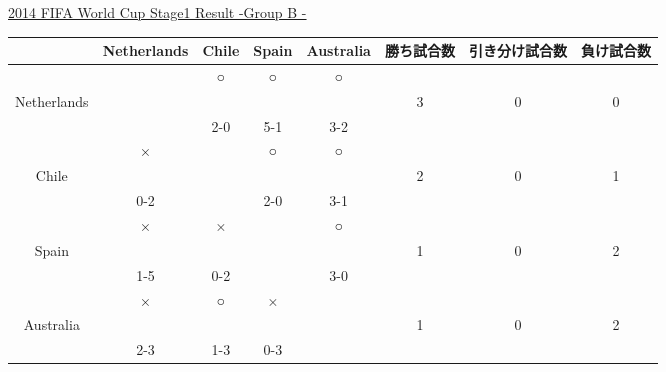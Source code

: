 \documentclass[a4j] {jarticle}
\begin{document}
		\begin{table}[htb]
		\begin{center}
		\underline{2014 FIFA World Cup Stage1 Result
-Group B
-}
		\begin{tabular}{|c|c|c|c|c|c|c|c|}
		\hline
		\multicolumn{1}{|c|}{} &
		\multicolumn{1}{c|}{Netherlands} &
		\multicolumn{1}{c|}{Chile} &
		\multicolumn{1}{c|}{Spain} &
		\multicolumn{1}{c|}{Australia} &
		\multicolumn{1}{c|}{勝ち試合数} &
		\multicolumn{1}{c|}{引き分け試合数} &
		\multicolumn{1}{c|}{負け試合数} \\
		\hline
 &  & ○ & ○ & ○ & & & \\ 
Netherlands & & & & & 3 & 0 & 0 \\ 
 & & 2-0 & 5-1 & 3-2 &  & & \\ 
 \hline
 & × &  & ○ & ○ & & & \\ 
Chile & & & & & 2 & 0 & 1 \\ 
 &0-2 &  & 2-0 & 3-1 &  & & \\ 
 \hline
 & × & × &  & ○ & & & \\ 
Spain & & & & & 1 & 0 & 2 \\ 
 &1-5 & 0-2 &  & 3-0 &  & & \\ 
 \hline
 & × & ○ & × &  & & & \\ 
Australia & & & & & 1 & 0 & 2 \\ 
 &2-3 & 1-3 & 0-3 &  &  & & \\ 
 \hline
		\end{tabular}
		\end{center}
		\end{table}
		\newpage
\end{document}
